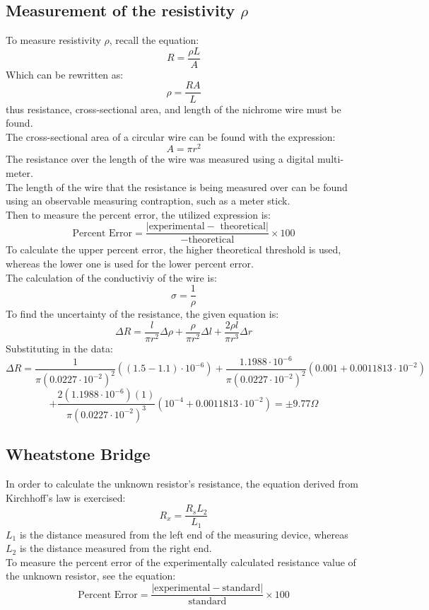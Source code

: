 \documentclass[titlepage]{article}
\begin{document}
	\subsection{Measurement of the resistivity $\rho$}
	To measure resistivity $\rho$, recall the equation:
	$$R = \frac{\rho L}{A}$$
	Which can be rewritten as:
	$$\rho = \frac{RA}{L}$$
	thus resistance, cross-sectional area, and length of the nichrome wire must be found. \\
	\vspace{0.5cm}
	The cross-sectional area of a circular wire can be found with the expression:
	$$A = \pi r^{2}$$
	\vspace{0.5cm}
	The resistance over the length of the wire was measured using a digital multi-meter.\\
	\vspace{0.05cm}
	The length of the wire that the resistance is being measured over can be found using an observable measuring contraption, such as a meter stick.\\
	\vspace{0.5cm}
	Then to measure the percent error, the utilized expression is:
	$$\text{Percent Error} = \frac{|\text{experimental} -\text{ theoretical}|}{-\text{theoretical}} \times 100$$
	To calculate the upper percent error, the higher theoretical threshold is used, whereas the lower one is used for the lower percent error.\\
	The calculation of the conductiviy of the wire is:
	$$\sigma = \frac{1}{\rho}$$
	To find the uncertainty of the resistance, the given equation is:
	$$\Delta R = \frac{l}{\pi r^{2}} \Delta \rho + \frac{\rho}{\pi r^{2}} \Delta l + \frac{2 \rho l}{\pi r^{3}} \Delta r$$
	Substituting in the data:
	$$\Delta R = \frac{1}{\pi \left(0.0227\cdot10^{-2}\right)^{2}} \left(\left(1.5-1.1\right)\cdot10^{-6}\right)  + \frac{1.1988\cdot10^{-6}}{\pi \left(0.0227\cdot10^{-2}\right)^{2}} \left(0.001+0.0011813\cdot10^{-2}\right)$$
	$$+ \frac{2\left(1.1988\cdot10^{-6}\right) \left(1\right)}{\pi \left(0.0227\cdot10^{-2}\right)^{3}} \left(10^{-4}+0.0011813\cdot10^{-2}\right) = \pm 9.77\Omega$$

	\subsection{Wheatstone Bridge}
In order to calculate the unknown resistor's resistance, the equation derived from Kirchhoff's law is exercised:
$$R_{x} = \frac{R_{s} L_{2}}{L_{1}}$$	
$L_{1}$ is the distance measured from the left end of the measuring device, whereas $L_{2}$ is the distance measured from the right end.\\
To measure the percent error of the experimentally calculated resistance value of the unknown resistor, see the equation:
	$$\text{Percent Error} = \frac{|\text{experimental} -\text{standard}|}{\text{standard}} \times 100$$
\end{document}
